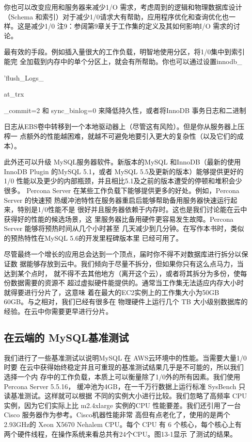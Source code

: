 你也可以改变应用和服务器来减少1/O 需求，考虑周到的逻辑和物理数据库设计（Schema
和索引）对于减少1/0请求大有帮助，应用程序优化和查询优化也一样。这是减少1/0
注9：参阔第9章关于工作集的定义及其如何影响I/O 需求的讨论。

最有效的手段。例如插入量很大的工作负载，明智地使用分区，将1/0集中到索引能完
全加载到内存中的单个分区上，就会有所帮助。你也可以通过设置innodb\_

'flush\_Logs\_

at\_trx

\_commit=2 和 sync\_binlog=0 来降低持久性，或者将InnoDB 事务日志和二进制

日志从EBS卷中转移到一个本地驱动器上（尽管这有风险）。但是你从服务器上压榨一
点额外的性能越困难，就越不可避免地要引入更大的复杂性（以及它们的成本）。

此外还可以升级 MySQL服务器软件。新版本的MySQL 和InnoDB（最新的使用
InnoDB Plugin 的MySQL 5.1，或者 MySQL 5.5及更新的版本）能够提供更好的1/0
性能以及更少的内部瓶颈，并且相比5.1及之前的版本遭受的停顿和堆积会少很多。
Percona Server 在某些工作负载下能够提供更多的好处。例如，Percona Server 的快速预
热缓冲池特性在服务器重启后能够帮助备用服务器快速运行起来，特别是1/0性能不是
很好并且服务器依赖于内存时。这也是我们讨论能在云中获得好的性能的候选场景，这
里服务器比备用硬件更容易发生故障。Percona Server 能够将预热时间从几个小时甚至
几天减少到几分钟。在写作本书时，类似的预热特性在MySQL 5.6的开发里程碑版本里
已经可用了。

尽管最终一个增长的应用总会达到一个顶点，届时你不得不对数据库进行拆分以保证数
据能够存放到云中。我们倾向于尽量不拆分，但如果你只有这么点马力，当达到某个点时，
就不得不去其他地方（离开这个云），或者将其拆分为多份，使每份数据需要的资源不
超过虚拟硬件能提供的。通常当工作集无法适应内存大小时就得要进行分片了，这意味
着在最大的EC2实例上的工作集大小为50GB ~ 60GB。与之相对，我们已经有很多在
物理硬件上运行几个 TB 大小级别数据库的经验。在云中你需要更早进行分片。

\subsection{在云端的 MySQL基准测试}
我们进行了一些基准测试以说明MySQL 在 AWS云环境中的性能。当需要大量1/0时要
在云中获得始终稳定并且可重现的基准测试结果几乎是不可能的，所以我们选择一个内
存中的工作负载，本质上可以衡量除了1/0外的所有因素。我们使用 Percona Server 5.5.16，
缓冲池为4GB，在一千万行数据上运行标准 SysBench 只读基准测试。这样就可以根据
不同的实例大小进行比较。我们忽略了高频率 CPU实例，因为它们实际上比 m2.4xlarge
实例的CPU 性能要差。我们还引用了一台 Cisco 服务器作为参考。Cisco机器性能非常
高但有点老化了，使用的是两个 2.93GHz的 Xeon X5670 Nehalem CPU。每个 CPU 有 6
个核心，每个核心上有两个硬件线程，在操作系统来看总共有24个CPU。图13-1显示
了测试的结果。

